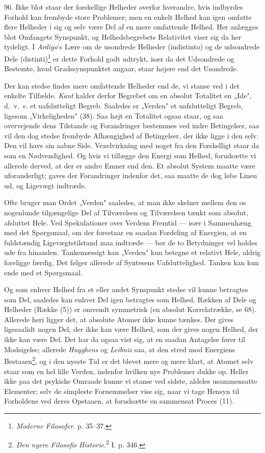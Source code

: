 \documentclass[12pt,a4paper]{book}
\newcommand{\apage}[1]{\marginnote{\footnotesize\textit{[#1]}}}
\begin{document}
96. Ikke blot staar der forskellige Helheder overfor hverandre, hvis indbyrdes
Forhold kan frembyde store Problemer; men en enkelt Helhed kan igen omfatte flere
Helheder i sig og selv være Del af en mere omfattende Helhed. Her anlægges blot
Omfangets Synspunkt, og Helhedsbegrebets Relativitet viser sig da her tydeligt. I
\emph{Ardigo}'s Lære om de usondrede Helheder (indistinto) og de udsondrede Dele
(distinti)\footnote{\emph{Moderne Filosofer}. p. 35--37.} er dette Forhold godt
udtrykt, især da det Udsondrede og Bestemte, hvad Gradssynspunktet angaar, staar højere end det Usondrede.

Der kan stedse findes mere omfattende Helheder end de, vi stanse ved i det enkelte
Tilfælde. \emph{Kant} kalder derfor Begrebet om en absolut Totalitet en „Ide",
d.\ v.\ s. et uafslutteligt Begreb. Saaledes er „Verden" et uafslutteligt Begreb,
ligesom „Virkeligheden" (38). Saa højt en Totalitet ogsaa staar, og saa overvejende
dens Tilstande og Forandringer bestemmes ved indre Betingelser, saa vil den dog
stedse frembyde Afhængighed af Betingelser, der ikke ligge i den selv. Den vil have
sin aabne Side. Vexelvirkning med noget fra den Forskelligt staar da som en
Nødvendighed. Og hvis vi tillægge den Energi som Helhed, forudsætte vi allerede
derved, at der er andre Emner end den. Et absolut System maatte være uforanderligt;
gaves der Forandringer indenfor det, saa maatte de dog løbe Linen ud, og Ligevægt
indtræde.

Ofte bruger man Ordet „Verden" saaledes, at man ikke skelner mellem den os
nogenlunde tilgængelige Del af Tilværelsen og Tilværelsen tænkt som absolut,
afsluttet Hele. Ved Spekulationer over Verdens Fremtid --- især i Sammenhæng med det Spørgsmaal, om der forestaar en saadan Fordeling af Energien, at en fuldstændig
Ligevægtstilstand maa indtræde --- bør de to Betydninger vel holdes ude fra
hinanden. Tankemæssigt kan „Verden" kun betegne et relativt Hele, aldrig foreligge
færdig. Det følger allerede af Syntesens Uafsluttelighed. Tanken kan kun ende med et
Spørgsmaal.

\apage{227} Og som enhver Helhed fra et eller andet Synspunkt stedse vil kunne betragtes som
Del, saaledes kan enhver Del igen betragtes som Helhed. Rækken af Dele og Helheder
(Række (5)) er omvendt symmetrisk (en absolut Korrelatrække, se 68). Allerede heri
ligger det, at absolute Atomer ikke kunne tænkes. Der gives ligesaalidt nogen Del,
der ikke kan være Helhed, som der gives nogen Helhed, der ikke kan være Del. Det har
da ogsaa vist sig, at en saadan Antagelse fører til Modsigelse; allerede
\emph{Huyghens} og \emph{Leibniz} saa, at den stred mod Energiens
Bestaaen\footnote{\emph{Den nyere Filosofis Historie}.\textsuperscript{2} I. p.
346.}, og i den nyeste Tid er det blevet mere og mere klart, at Atomet selv staar
som en hel lille Verden, indenfor hvilken nye Problemer dukke op. Heller ikke paa
det psykiske Omraade kunne vi stanse ved sidste, aldeles usammensatte Elementer;
selv de simpleste Fornemmelser vise sig, naar vi tage Hensyn til Forholdene ved
deres Opstaaen, at forudsætte en sammensat Proces (11).
\end{document}
